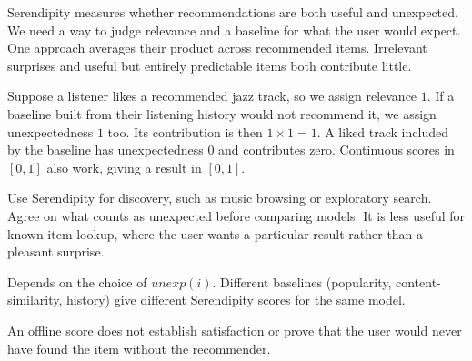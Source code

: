 \metricend
\clearpage
\thispagestyle{rankingstyle}
\label{sec:serendipity}

Serendipity measures whether recommendations are both useful and unexpected. We need a way to judge relevance and a baseline for what the user would expect. One approach averages their product across recommended items. Irrelevant surprises and useful but entirely predictable items both contribute little.

\begin{metricformula}
\end{metricformula}

Suppose a listener likes a recommended jazz track, so we assign relevance $1$. If a baseline built from their listening history would not recommend it, we assign unexpectedness $1$ too. Its contribution is then $1 \times 1 = 1$. A liked track included by the baseline has unexpectedness $0$ and contributes zero. Continuous scores in $[0,1]$ also work, giving a result in $[0,1]$.


Use Serendipity for discovery, such as music browsing or exploratory search. Agree on what counts as unexpected before comparing models. It is less useful for known-item lookup, where the user wants a particular result rather than a pleasant surprise.

{
    \item Depends on the choice of $unexp(i)$. Different baselines (popularity, content-similarity, history) give different Serendipity scores for the same model.
    \item An offline score does not establish satisfaction or prove that the user would never have found the item without the recommender.
}

